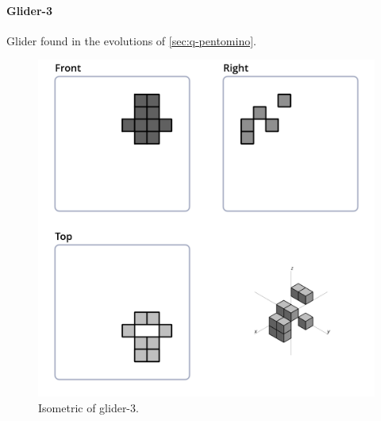 \paragraph{Glider-3}
Glider found in the evolutions of \ref{sec:q-pentomino}.
\begin{figure}
  \centering
  \includegraphics[scale=0.3]{iso_settings/glider_3.png}
  \caption{Isometric of glider-3.}
  \label{fig:iso-glider-3}
\end{figure}

